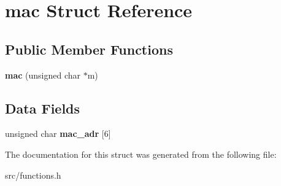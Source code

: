 \hypertarget{structmac}{\section{mac Struct Reference}
\label{structmac}
}
\subsection*{Public Member Functions}
\begin{DoxyCompactItemize}
\item 
\hypertarget{structmac_ab543436d0c27ddc7d57d1bb20b0fb117}{{\bfseries mac} (unsigned char $\ast$m)}\label{structmac_ab543436d0c27ddc7d57d1bb20b0fb117}

\end{DoxyCompactItemize}
\subsection*{Data Fields}
\begin{DoxyCompactItemize}
\item 
\hypertarget{structmac_a3dee6a8160024aad03e1e57e4538793f}{unsigned char {\bfseries mac\-\_\-adr} \mbox{[}6\mbox{]}}\label{structmac_a3dee6a8160024aad03e1e57e4538793f}

\end{DoxyCompactItemize}


The documentation for this struct was generated from the following file\-:\begin{DoxyCompactItemize}
\item 
src/functions.\-h\end{DoxyCompactItemize}
